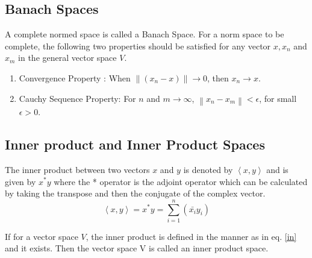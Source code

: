 \documentclass[a4paper,12pt]{article}
\newcommand\norm[1]{\left\lVert#1\right\rVert}
\begin{document}
	\subsection{Banach Spaces}
	A complete normed space is called a Banach Space. For a norm space to be complete, the following two properties should be satisfied for any vector $x, x_{n}$ and $x_{m}$ in the general vector space $V$.
		\begin{enumerate}
			\item Convergence Property : When $\norm{(x_{n} -x)}\rightarrow 0$, then $x_{n} \rightarrow x$.
			\item Cauchy Sequence Property: For $n$ and $m \rightarrow \infty$, $\norm{x_{n}-x_{m}} < \epsilon$, for small $\epsilon > 0$. 		\end{enumerate}
%	
	\subsection{Inner product and Inner Product Spaces} The inner product between two vectors $x$ and $y$ is denoted by $\left\langle x, y \right\rangle$ and is given by $x^{*}y$ where the * operator is the adjoint operator which can be calculated by taking the transpose and then the conjugate of the complex vector.
		\begin{equation*}
			\left\langle x, y \right\rangle = x^{*}y = \sum\limits_{i=1}^n (\bar{x_{i}}y_{i})
			\label{in}
		\end{equation*}
		
		If for a vector space $V$, the inner product is defined in the manner as in eq. \ref{in} and it exists. Then the vector space V is called an inner product space.
\end{document}
